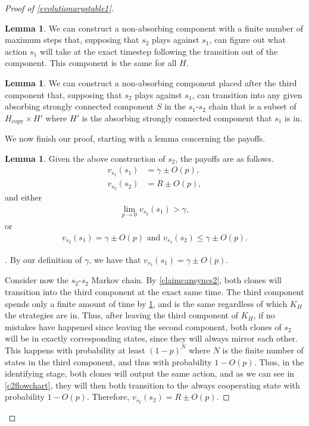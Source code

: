 \documentclass[12pt]{article}
\theoremstyle{definition}
\newtheorem{lemma}[theorem]{Lemma}
\theoremstyle{remark}
\newenvironment{subproof}[1][\proofname]{%
  \renewcommand{\qedsymbol}{$\blacksquare$}%
  \begin{proof}[#1]%
}{%
  \end{proof}%
}
\begin{document}
\begin{proof}[Proof of \cref{evolutionarystable1}]
      \begin{lemma}
        \label{claimcanfigureout}
        We can construct a non-absorbing component with a finite number of maximum steps that, supposing that $s_2$ plays against $s_1$, can figure out what action $s_1$ will take at the exact timestep following the transition out of the component. This component is the same for all $H$.
      \end{lemma}

      \begin{lemma}
        \label{claimcanforcegoodstate}
        We can construct a non-absorbing component placed after the third component that, supposing that $s_2$ plays against $s_1$, can transition into any given absorbing strongly connected component $S$ in the $s_1$-$s_2$ chain that is a subset of $H_\text{copy} \times H'$ where $H'$ is the absorbing strongly connected component that $s_1$ is in.
      \end{lemma}

      We now finish our proof, starting with a lemma concerning the payoffs.

      \begin{lemma}
        \label{claimpayoffs}
        Given the above construction of $s_2$, the payoffs are as follows.
      \begin{align*}
        v_{s_1}(s_1) &= \gamma \pm O(p), \\
        v_{s_2}(s_2) &= R \pm O(p),
      \end{align*}
      and either
      \begin{align*}
        \lim_{p \to 0} v_{s_2}(s_1) > \gamma,
      \end{align*}
      or
      \begin{align*}
        v_{s_2}(s_1) = \gamma \pm O(p) \text{ and }
        v_{s_1}(s_2) \leq \gamma \pm O(p).
      \end{align*}
      \end{lemma}
      \begin{subproof}
        By our definition of $\gamma$, we have that $v_{s_1}(s_1) = \gamma \pm O(p)$.

        Consider now the $s_2$-$s_2$ Markov chain. By \cref{claimcansyncs2}, both clones will transition into the third component at the exact same time. The third component spends only a finite amount of time by \cref{claimcanfigureout}, and is the same regardless of which $K_H$ the strategies are in. Thus, after leaving the third component of $K_H$, if no mistakes have happened since leaving the second component, both clones of $s_2$ will be in exactly corresponding states, since they will always mirror each other. This happens with probability at least $(1-p)^N$ where $N$ is the finite number of states in the third component, and thus with probability $1 - O(p)$. Thus, in the identifying stage, both clones will output the same action, and as we can see in \cref{c2flowchart}, they will then both transition to the always cooperating state with probability $1 - O(p)$. Therefore, $v_{s_2}(s_2) = R \pm O(p)$.


\end{subproof}
\end{proof}
\end{document}
